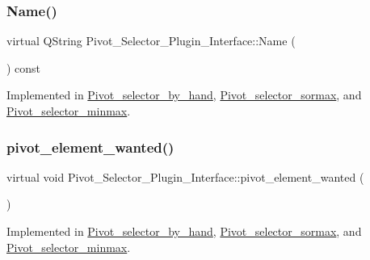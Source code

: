 \subsubsection{\texorpdfstring{Name()}{Name()}\hspace{0.1cm}{\footnotesize\ttfamily [4/4]}}
{\footnotesize\ttfamily virtual Q\+String Pivot\+\_\+\+Selector\+\_\+\+Plugin\+\_\+\+Interface\+::\+Name (\begin{DoxyParamCaption}{ }\end{DoxyParamCaption}) const\hspace{0.3cm}{\ttfamily [pure virtual]}}



Implemented in \hyperlink{classPivot__selector__by__hand_adb03a4ea722819c478e5fd71e5e6f364}{Pivot\+\_\+selector\+\_\+by\+\_\+hand}, \hyperlink{classPivot__selector__sormax_a72875b6810a0f83c77ff2abde1b186a4}{Pivot\+\_\+selector\+\_\+sormax}, and \hyperlink{classPivot__selector__minmax_a9df8c5a5f3a0cf1f9c97ee8d8ad68b1b}{Pivot\+\_\+selector\+\_\+minmax}.

\mbox{\label{classPivot__Selector__Plugin__Interface_a79edca6930746a137a95a26239f7af5e}} 
\subsubsection{\texorpdfstring{pivot\+\_\+element\+\_\+wanted()}{pivot\_element\_wanted()}\hspace{0.1cm}{\footnotesize\ttfamily [1/4]}}
{\footnotesize\ttfamily virtual void Pivot\+\_\+\+Selector\+\_\+\+Plugin\+\_\+\+Interface\+::pivot\+\_\+element\+\_\+wanted (\begin{DoxyParamCaption}\item[{Q\+Standard\+Item\+Model $\ast$}]{ }\end{DoxyParamCaption})\hspace{0.3cm}{\ttfamily [pure virtual]}}



Implemented in \hyperlink{classPivot__selector__by__hand_adbb9dac36bf6cc6807433c617c19ad32}{Pivot\+\_\+selector\+\_\+by\+\_\+hand}, \hyperlink{classPivot__selector__sormax_acfb3f057c0d2dd29b33ef23d547dfe36}{Pivot\+\_\+selector\+\_\+sormax}, and \hyperlink{classPivot__selector__minmax_ae47a96737d527fa40d1ee6608caf9bf3}{Pivot\+\_\+selector\+\_\+minmax}.

